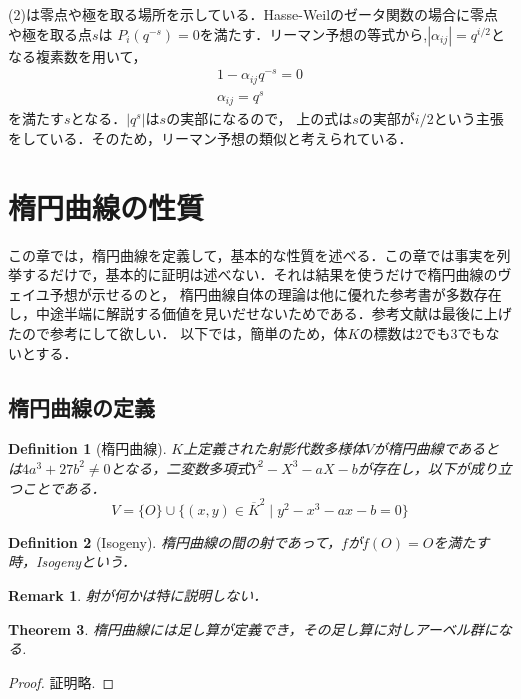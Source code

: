 \documentclass{ujarticle}
\newtheorem{thm}{Theorem}[section]
\newtheorem{dfn}[thm]{Definition}
\newtheorem*{rem}{Remark}
\begin{document}
(2)は零点や極を取る場所を示している．Hasse-Weilのゼータ関数の場合に零点や極を取る点$s$は
$P_i(q^{-s})=0$を満たす．リーマン予想の等式から,$|\alpha_{ij}|=q^{i/2}$となる複素数を用いて，
\begin{eqnarray*}
   1- \alpha_{ij} q^{-s}=0  \\
   \alpha_{ij} =q^{s}
\end{eqnarray*}
を満たす$s$となる．$|q^{s}|$は$s$の実部になるので，
上の式は$s$の実部が$i/2$という主張をしている．そのため，リーマン予想の類似と考えられている．


\section{楕円曲線の性質}
\label{sec:楕円曲線の性質}
この章では，楕円曲線を定義して，基本的な性質を述べる．この章では事実を列挙するだけで，基本的に証明は述べない．それは結果を使うだけで楕円曲線のヴェイユ予想が示せるのと，
楕円曲線自体の理論は他に優れた参考書が多数存在し，中途半端に解説する価値を見いだせないためである．参考文献は最後に上げたので参考にして欲しい．
以下では，簡単のため，体$K$の標数は2でも3でもないとする．

\subsection{楕円曲線の定義}
\label{sub:楕円曲線の定義}

\begin{dfn}[楕円曲線]
  $K$上定義された射影代数多様体$V$が楕円曲線であるとは$4a^3+27b^2\neq0$となる，二変数多項式$Y^2 - X^3 - aX - b$が存在し，以下が成り立つことである．
  \begin{equation*}
   V=\{O \} \cup \{ (x,y) \in \overline{K}^2 \mid y^2 - x^3 - ax - b=0 \}
  \end{equation*}
\end{dfn}

\begin{dfn}[Isogeny]
楕円曲線の間の射であって，$f$が$f(O)=O$を満たす時，Isogenyという．
\end{dfn}
\begin{rem}
 射が何かは特に説明しない．
\end{rem}

\begin{thm}
  楕円曲線には足し算が定義でき，その足し算に対しアーベル群になる.
\end{thm}
\begin{proof}
 証明略.
\end{proof}
\end{document}
